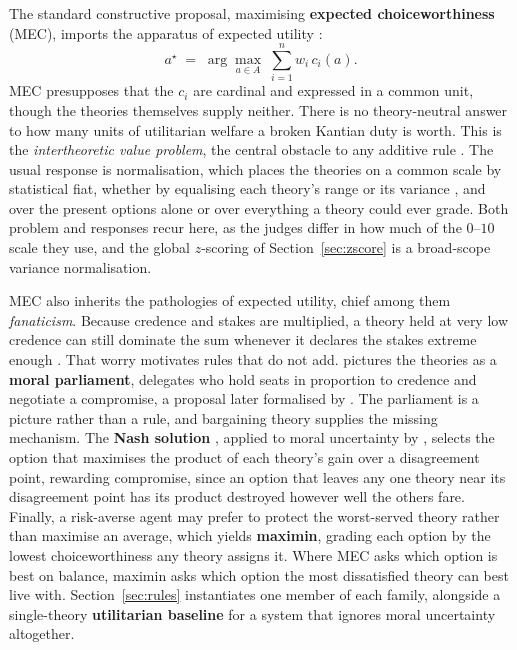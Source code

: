 \documentclass[10pt,twocolumn,a4paper]{article}
\begin{document}
The standard constructive proposal, maximising \textbf{expected
choiceworthiness} (MEC), imports the apparatus of expected utility
\cite{lockhart2000,macaskill2020}:
\[
  a^{\star} \;=\; \arg\max_{a \in A}\; \sum_{i=1}^{n} w_i\, c_i(a).
\]
MEC presupposes that the $c_i$ are cardinal and expressed in a common unit,
though the theories themselves supply neither. There is no theory-neutral answer
to how many units of utilitarian welfare a broken Kantian duty is worth.
This is the \emph{intertheoretic value problem}, the central obstacle to
any additive rule \cite{macaskill2020}. The usual response is
normalisation, which places the theories on a common scale by statistical
fiat, whether by equalising each theory's range \cite{lockhart2000} or
its variance \cite{cottonbarratt2020}, and over the present options alone
or over everything a theory could ever grade. Both problem and responses
recur here, as the judges differ in how much of the $0$--$10$ scale they
use, and the global $z$-scoring of Section~\ref{sec:zscore} is a
broad-scope variance normalisation.

MEC also inherits the pathologies of expected utility, chief among them
\emph{fanaticism}. Because credence and stakes are multiplied, a theory
held at very low credence can still dominate the sum whenever it
declares the stakes extreme enough \cite{macaskill2020}. That worry
motivates rules that do not add. \citet{bostrom2009} pictures the
theories as a \textbf{moral parliament}, delegates who hold seats in
proportion to credence and negotiate a compromise, a proposal later
formalised by \citet{newberry2021}. The parliament is a picture rather
than a rule, and bargaining theory supplies the missing mechanism. The
\textbf{Nash solution} \cite{nash1950}, applied to moral uncertainty by
\citet{greaves2019}, selects the option that maximises the product of
each theory's gain over a disagreement point, rewarding compromise,
since an option that leaves any one theory near its disagreement point
has its product destroyed however well the others fare. Finally, a
risk-averse agent may prefer to protect the worst-served
theory rather than maximise an average, which yields \textbf{maximin},
grading each option by the lowest choiceworthiness any theory assigns
it. Where MEC asks which option is best on balance, maximin asks which
option the most dissatisfied theory can best live with.
Section~\ref{sec:rules} instantiates one member of each family,
alongside a single-theory \textbf{utilitarian baseline} for a system
that ignores moral uncertainty altogether.
\end{document}
